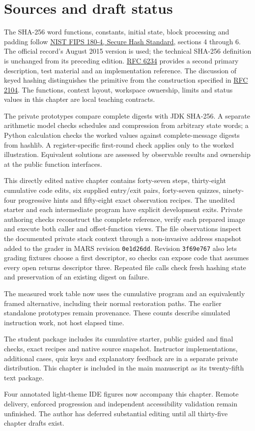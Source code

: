 \section*{Sources and draft status}
The SHA-256 word functions, constants, initial state, block processing and padding follow
\href{https://doi.org/10.6028/NIST.FIPS.180-4}{NIST FIPS 180-4, Secure Hash Standard},
sections 4 through 6. The official record's August 2015 version is used; the technical
SHA-256 definition is unchanged from its preceding edition.
\href{https://www.rfc-editor.org/rfc/rfc6234}{RFC 6234} provides a second primary
description, test material and an implementation reference. The discussion of keyed
hashing distinguishes the primitive from the construction specified in
\href{https://www.rfc-editor.org/rfc/rfc2104}{RFC 2104}. The functions, context layout,
workspace ownership, limits and status values in this chapter are local teaching contracts.

The private prototypes compare complete digests with JDK SHA-256. A separate arithmetic
model checks schedules and compression from arbitrary state words; a Python calculation
checks the worked values against complete-message digests from hashlib. A register-specific
first-round check applies only to the worked illustration. Equivalent solutions are
assessed by observable results and ownership at the public function interfaces.

This directly edited native chapter contains forty-seven steps, thirty-eight cumulative
code edits, six supplied entry/exit pairs, forty-seven quizzes, ninety-four progressive
hints and fifty-eight exact observation recipes. The unedited starter and each intermediate
program have explicit development exits. Private authoring checks reconstruct the complete
reference, verify each prepared image and execute both caller and offset-function views.
The file observations inspect the documented private stack context through a non-invasive
address snapshot added to the grader in MARS revision \texttt{0e1d26dd}.
Revision \texttt{3f69e767} also lets grading fixtures choose a first descriptor, so
checks can expose code that assumes every open returns descriptor three. Repeated
file calls check fresh hashing state and preservation of an existing digest on failure.

The measured work table now uses the cumulative program and an equivalently framed
alternative, including their normal restoration paths. The earlier standalone prototypes
remain provenance. These counts describe simulated instruction work, not host elapsed time.

The student package includes its cumulative starter, public guided and final checks,
exact recipes and native source snapshot. Instructor implementations, additional cases,
quiz keys and explanatory feedback are in a separate private distribution. This chapter
is included in the main manuscript as its twenty-fifth text package.

Four annotated light-theme IDE figures now accompany this chapter. Remote delivery,
enforced progression and independent accessibility validation remain unfinished. The
author has deferred substantial editing until all thirty-five chapter drafts exist.

